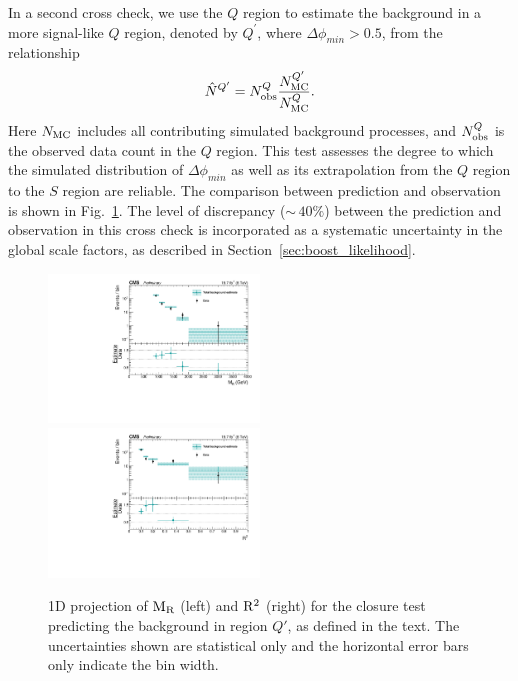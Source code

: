 In a second cross check, we use the $Q$ region to estimate the background in a more signal-like $Q$
region, denoted by $Q^\prime$, where $\Delta\phi_{min} > 0.5$, from the relationship
\begin{equation}
  \hat{N}^{Q^\prime} = N_{\rm obs}^Q \frac{N_{\rm MC}^{Q^\prime}}{N_{\rm MC}^Q}.
\end{equation}
Here $N_{\rm MC}$ includes all contributing simulated background processes, and $N_{\rm obs}^Q$ is
the observed data count in the $Q$ region.
This test assesses the degree to which the simulated distribution of $\Delta\phi_{min}$ as well as
its extrapolation from the $Q$ region to the $S$ region are reliable. The comparison between
prediction and observation is shown in Fig.~\ref{fig:Shape_syst_1D_project_QCD}.
The level of discrepancy (${\sim}\,40\%$) between the prediction and observation in this cross check 
is incorporated as a systematic uncertainty in the global scale factors, as described in
Section~\ref{sec:boost_likelihood}.

\begin{figure}[htpb]
\includegraphics[width=0.5\textwidth]
{figures/razor_selection/MR_comparison_data_estimate_0Lbg1uW0Ll_mdPhig0p5_from_0Lbg1uW0Ll_mdPhi0p3_log}
\includegraphics[width=0.5\textwidth]
{figures/razor_selection/R2_comparison_data_estimate_0Lbg1uW0Ll_mdPhig0p5_from_0Lbg1uW0Ll_mdPhi0p3_log}
\caption{1D projection of $\mathrm{M_R}$ (left) and $\mathrm{R^2}$ (right) for the closure test predicting the
background in region $Q'$, as defined in the text. The uncertainties shown are statistical only
and the horizontal error bars only indicate the bin width.
\label{fig:Shape_syst_1D_project_QCD}}
\end{figure}
